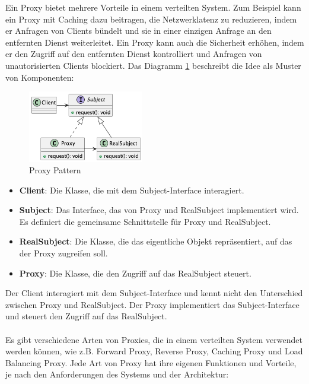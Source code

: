 \documentclass[../vs-script-first-v01.tex]{subfiles}
\begin{document}
Ein Proxy bietet mehrere Vorteile in einem verteilten System. Zum Beispiel kann ein Proxy mit Caching dazu beitragen, die Netzwerklatenz zu reduzieren, indem er Anfragen von Clients bündelt und sie in einer einzigen Anfrage an den entfernten Dienst weiterleitet. Ein Proxy kann auch die Sicherheit erhöhen, indem er den Zugriff auf den entfernten Dienst kontrolliert und Anfragen von unautorisierten Clients blockiert. Das Diagramm \ref{fig:proxy} beschreibt die Idee als Muster von Komponenten:
\begin{figure}[ht]
  \centering
  \includegraphics[width=0.45\textwidth]{fig/uml/proxy.png}
  \caption{Proxy Pattern}
  \label{fig:proxy}
\end{figure}
\begin{itemize}
\item \textbf{Client}: Die Klasse, die mit dem Subject-Interface interagiert.
\item \textbf{Subject}: Das Interface, das von Proxy und RealSubject implementiert wird. Es definiert die gemeinsame Schnittstelle für Proxy und RealSubject.
\item \textbf{RealSubject}: Die Klasse, die das eigentliche Objekt repräsentiert, auf das der Proxy zugreifen soll.
\item \textbf{Proxy}: Die Klasse, die den Zugriff auf das RealSubject steuert.
\end{itemize}

Der Client interagiert mit dem Subject-Interface und kennt nicht den Unterschied zwischen Proxy und RealSubject. Der Proxy implementiert das Subject-Interface und steuert den Zugriff auf das RealSubject.
\\\\
Es gibt verschiedene Arten von Proxies, die in einem verteilten System verwendet werden können, wie z.B. Forward Proxy, Reverse Proxy, Caching Proxy und Load Balancing Proxy. Jede Art von Proxy hat ihre eigenen Funktionen und Vorteile, je nach den Anforderungen des Systems und der Architektur:
\end{document}

